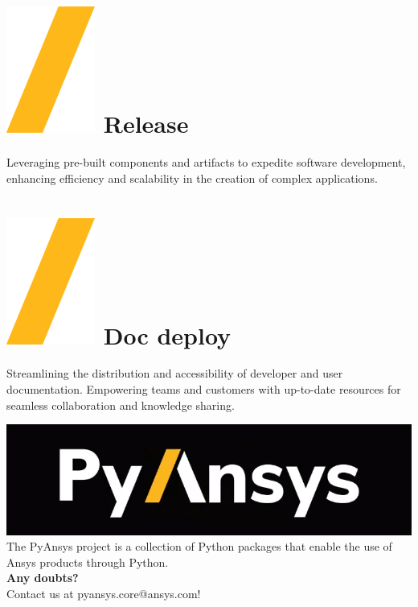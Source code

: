 \documentclass[a0paper,fleqn]{src/betterposter}
\begin{document}
{\section{\includegraphics[height=\fontcharht\font`\S]{img/general/slash.png} Release}
Leveraging pre-built components and artifacts to expedite software development,
enhancing efficiency and scalability in the creation of complex applications.

\section{\includegraphics[height=\fontcharht\font`\S]{img/general/slash.png} Doc deploy}
Streamlining the distribution and accessibility of developer and user
documentation. Empowering teams and customers with up-to-date resources for
seamless collaboration and knowledge sharing.

\vfill

\includegraphics[width=\textwidth]{img/general/pyansys_dark}\\
The PyAnsys project is a collection of Python packages that enable the use of Ansys products through Python.
\\
\newline
\textbf{Any doubts?} \\Contact us at pyansys.core@ansys.com!
\\
\newline

}
\end{document}
